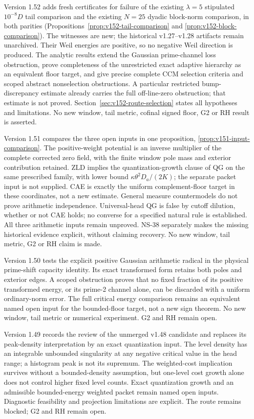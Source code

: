 \documentclass[11pt]{article}
\theoremstyle{remark}
\begin{document}
Version 1.52 adds fresh certificates for failure of the existing
$\lambda=5$ stipulated $10^{-8}D$ tail comparison and the existing
$N=25$ dyadic block-norm comparison, in both parities
(Propositions~\ref{prop:v152-tail-comparison} and
\ref{prop:v152-block-comparison}). The witnesses are new; the historical
v1.27--v1.28 artifacts remain unarchived. Their Weil energies are positive,
so no negative Weil direction is produced. The analytic results extend
the Gaussian prime-channel loss obstruction, prove completeness of the
unrestricted exact adaptive hierarchy as an equivalent floor target,
and give precise complete CCM selection criteria and scoped abstract
nonselection obstructions. A particular restricted bump-discrepancy
estimate already carries the full off-line-zero obstruction; that
estimate is not proved. Section~\ref{sec:v152-route-selection} states
all hypotheses and limitations. No new window, tail metric, cofinal
signed floor, G2 or RH result is asserted.

Version 1.51 compares the three open inputs in one proposition,
\ref{prop:v151-input-comparison}. The positive-weight potential is an
inverse multiplier of the complete corrected zero field, with the finite
window pole mass and exterior contribution retained. ZLD implies the
quantization-growth clause of QG on the same prescribed family, with
lower bound $\kappa\theta^2D_a/(2K)$; the separate packet input is not
supplied. CAE is exactly the uniform complement-floor target in these
coordinates, not a new estimate. General measure countermodels do not
prove arithmetic independence. Universal-head QG is false by cutoff
dilution, whether or not CAE holds; no converse for a specified natural
rule is established. All three arithmetic inputs remain unproved.
NS-38 separately makes the missing historical evidence explicit, without
claiming recovery. No new window, tail metric, G2 or RH claim is made.

Version 1.50 tests the explicit positive Gaussian arithmetic radical in
the physical prime-shift capacity identity. Its exact transformed form
retains both poles and exterior edges. A scoped obstruction proves that
no fixed fraction of its positive transformed energy, or its prime-2
channel alone, can be discarded with a uniform ordinary-norm error.
The full critical energy comparison remains an equivalent named open
input for the bounded-floor target, not a new sign theorem. No new
window, tail metric or numerical experiment. G2 and RH remain open.


Version 1.49 records the review of the unmerged v1.48 candidate and
replaces its peak-density interpretation by an exact quantization input.
The level density has an integrable unbounded singularity at any negative
critical value in the head range; a histogram peak is not its supremum.
The weighted-cost implication survives without a bounded-density assumption,
but one-level cost growth alone does not control higher fixed level counts.
Exact quantization growth and an admissible bounded-energy weighted packet
remain named open inputs. Diagnostic feasibility and projection limitations
are explicit. The route remains blocked; G2 and RH remain open.
\end{document}
